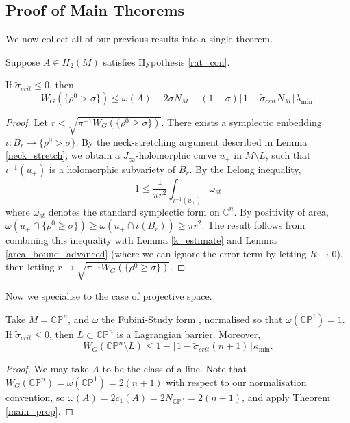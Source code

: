 \documentclass{article}
\numberwithin{equation}{section}
\numberwithin{figure}{section}
\begin{document}
\subsection{Proof of Main Theorems}
We now collect all of our previous results into a single theorem.
\begin{thm}
\label{T:1}
\label{main_prop}
Suppose $A\in H_2(M)$ satisfies Hypothesis \ref{rat_con}.

If $\tilde{\sigma}_{crit}\leq 0$, then
\begin{equation}
W_G(\{\rho^0>\sigma\})\leq \omega(A)-2\sigma N_M -(1-\sigma)\lceil1-\tilde{\sigma}_{crit}N_M\rceil\lambda_{\min}.
\end{equation}
\end{thm}
\begin{proof}
Let $r<\sqrt{\pi^{-1}W_G(\{\rho^0\geq \sigma\})}$. There exists a symplectic embedding $\iota:B_r\rightarrow \{\rho^0> \sigma\}$. By the neck-stretching argument described in Lemma \ref{neck_stretch}, we obtain a $J_\infty$-holomorphic curve $u_+$ in $M\setminus L$, such that $\iota^{-1}(u_+)$ is a holomorphic subvariety of $B_r$. By the Lelong inequality,
\begin{equation}
    1\leq \frac{1}{\pi r^2}\int_{\iota^{-1}(u_+)}\omega_{st}
\end{equation}
where $\omega_{st}$ denotes the standard symplectic form on $\mathbb{C}^n$. By positivity of area, $\omega(u_+\cap \{\rho^0\geq \sigma\})\geq \omega(u_+\cap \iota(B_r))\geq \pi r^2$. The result follows from combining this inequality with Lemma \ref{k_estimate} and Lemma \ref{area_bound_advanced} (where we can ignore the error term by letting $R\to 0$), then letting $r\to \sqrt{\pi^{-1}W_G(\{\rho^0\geq \sigma\})}$.
\end{proof}

Now we specialise to the case of projective space.
\begin{thm}
\label{T:2}
\label{proj_skel}
    Take $M=\mathbb{CP}^n$, and $\omega$ the Fubini-Study form , normalised so that $\omega(\mathbb{CP}^1)=1$. If $\tilde{\sigma}_{crit}\leq 0$, then $L\subset \mathbb{CP}^n$ is a Lagrangian barrier. Moreover,
    \begin{equation}
        W_G(\mathbb{CP}^n\setminus L)\leq 1-\lceil 1-\tilde{\sigma}_{crit}(n+1)\rceil \kappa_{\min}.
    \end{equation}
\end{thm}
\begin{proof}
We may take $A$ to be the class of a line. Note that $W_G(\mathbb{CP}^n)=\omega(\mathbb{CP}^1)=2(n+1)$ with respect to our normalisation convention, so $\omega(A)=2c_1(A)=2N_{\mathbb{CP}^n}=2(n+1)$, and apply Theorem \ref{main_prop}.
\end{proof}
\end{document}
